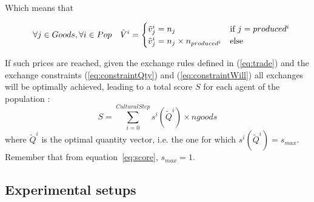 \documentclass{wscpaperproc}
\begin{document}
Which means that 

\begin{equation}
	\quad \forall j \in Goods, \forall i \in Pop \quad \tilde{V}^i = 
	\begin{cases}
		\tilde{v}^i_j = n_j & \text{if $ j=produced^i$}\\
		 \tilde{v}^i_j = n_j \times n_{produced^i} & \text{else}
	\end{cases}\label{eq:optimum}
\end{equation}


If such prices are reached, given the exchange rules defined in (\ref{eq:trade}) and the exchange constraints (\ref{eq:constraintQty}) and (\ref{eq:constraintWill}) all exchanges will be optimally achieved, leading to a total score $S$ for each agent of the population : 
$$ S = \sum_{i=0}^{CulturalStep}  s^i(\tilde{Q}^i) \times ngoods $$ 
where $\tilde{Q}^i$ is the optimal quantity vector, i.e. the one for which $s^i(\tilde{Q}^i) = s_{max}$. Remember that from equation~\ref{eq:score}, $s_{max}=1$.

\subsection{Experimental setups}
%
\end{document}

